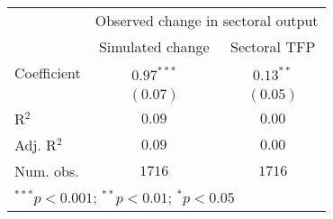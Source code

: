 
\begin{tabular}{l c c}
\hline
 & \multicolumn{2}{c}{Observed change in sectoral output} \\
\cline{2-3}
 & Simulated change & Sectoral TFP \\
\hline
Coefficient & $0.97^{***}$ & $0.13^{**}$ \\
            & $(0.07)$     & $(0.05)$    \\
\hline
R$^2$       & $0.09$       & $0.00$      \\
Adj. R$^2$  & $0.09$       & $0.00$      \\
Num. obs.   & $1716$       & $1716$      \\
\hline
\multicolumn{3}{l}{\scriptsize{$^{***}p<0.001$; $^{**}p<0.01$; $^{*}p<0.05$}}
\end{tabular}
